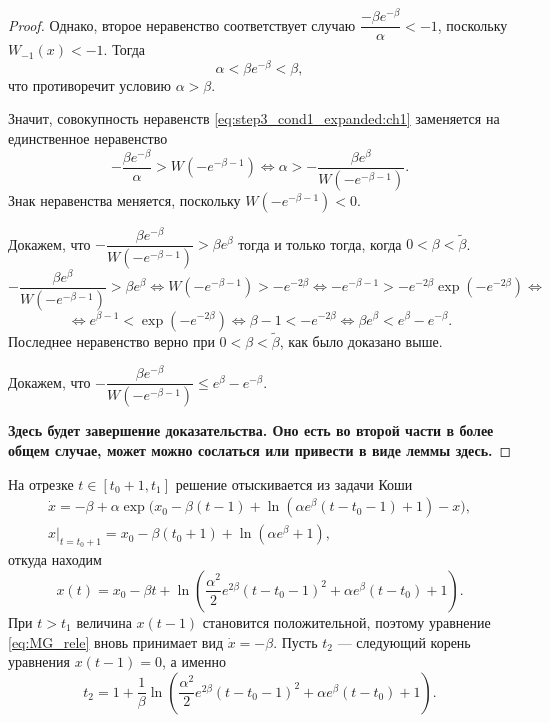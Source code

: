 \begin{proof}
Однако, второе неравенство соответствует случаю $\dfrac{-\beta e^{-\beta}}{\alpha} < -1$, поскольку $W_{-1}(x) < -1$. Тогда
\[
\alpha < \beta e^{-\beta} < \beta,
\]
что противоречит условию $\alpha > \beta$.

Значит, совокупность неравенств \eqref{eq:step3_cond1_expanded:ch1} заменяется на единственное неравенство
\[
    -\frac{\beta e^{-\beta}}{\alpha} > W(-e^{-\beta - 1}) \Leftrightarrow \alpha > -\dfrac{\beta e^{\beta}}{W(-e^{-\beta - 1})}.
\]
%
Знак неравенства меняется, поскольку $W(-e^{-\beta - 1}) < 0$.

Докажем, что $-\dfrac{\beta e^{-\beta}}{W(-e^{-\beta - 1})} > \beta e^{\beta}$ тогда и только тогда, когда $0 < \beta < \tilde{\beta}$.
%
\[
-\dfrac{\beta e^{\beta}}{W(-e^{-\beta - 1})} > \beta e^{\beta} \Leftrightarrow W(-e^{-\beta - 1}) > -e^{-2\beta} \Leftrightarrow -e^{-\beta - 1} > -e^{-2\beta} \exp(-e^{-2\beta}) \Leftrightarrow
\]
%
\[
\Leftrightarrow e^{\beta - 1} < \exp(-e^{-2\beta}) \Leftrightarrow \beta - 1 < -e^{-2\beta} \Leftrightarrow \beta e^{\beta} < e^{\beta} - e^{-\beta}.
\]
Последнее неравенство верно при $0 < \beta < \tilde{\beta}$, как было доказано выше.

Докажем, что $-\dfrac{\beta e^{-\beta}}{W(-e^{-\beta - 1})} \leqslant e^{\beta} - e^{-\beta}$.

\textbf{Здесь будет завершение доказательства. Оно есть во второй части в более общем случае, может можно сослаться или привести в виде леммы здесь.}

\end{proof}

На отрезке $t \in [t_0 + 1, t_1]$ решение отыскивается из задачи Коши 
%
\begin{multline}
    \dot{x} = -\beta + \alpha\exp\bigg(x_0 - \beta(t - 1) + \ln(\alpha e^{\beta}(t - t_0 - 1) + 1) - x\bigg),\\
    x|_{t = t_0 + 1} = x_0 - \beta (t_0 + 1) +\ln(\alpha e^{\beta} + 1),
\end{multline}
%
откуда находим
\begin{equation}
    x(t) = x_0-\beta t+\ln\left(\frac{\alpha^2}{2}e^{2\beta}(t-t_0-1)^2+\alpha e^{\beta}(t-t_0)+1\right).
\end{equation}
%
При $t > t_1$ величина $x(t - 1)$ становится положительной, поэтому уравнение \eqref{eq:MG_rele} вновь принимает вид $\dot{x} = -\beta$. Пусть $t_2$ --- следующий корень уравнения $x(t - 1) = 0$, а именно
\begin{equation}
\label{eq:t2}
t_2 = 1 + \dfrac{1}{\beta}\ln\left(\frac{\alpha^2}{2}e^{2\beta}(t-t_0-1)^2+\alpha e^{\beta}(t-t_0)+1\right).
\end{equation}

